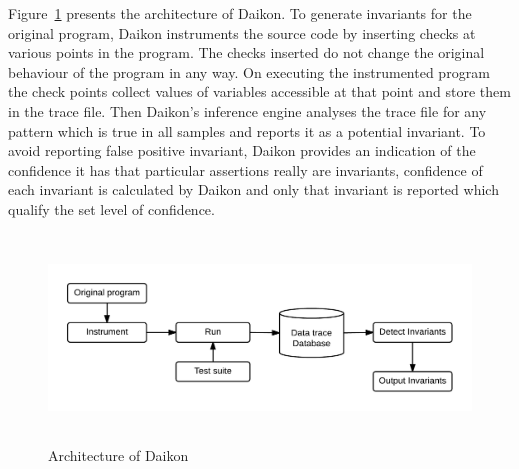 Figure~\ref{fig:daikon} presents the architecture of Daikon. To generate invariants for the original program, Daikon instruments the source code by inserting checks at various points in the program. The checks inserted do not change the original behaviour of the program in any way. On executing the instrumented program the check points collect values of variables accessible at that point and store them in the trace file. Then Daikon's inference engine analyses the trace file for any pattern which is true in all samples and reports it as a potential invariant. To avoid reporting false positive invariant, Daikon provides an indication of the confidence it has that particular assertions really are invariants, confidence of each invariant is calculated by Daikon and only that invariant is reported which qualify the set level of confidence. 

\bigskip
\begin{figure}[H]
\centering
\includegraphics[width= 15.5cm,height=5.5cm]{chapter7/daikonWorking1.png}
\bigskip
\caption{Architecture of Daikon~\cite{ernst2001dynamically}}
\label{fig:daikon}
\end{figure}
\bigskip

